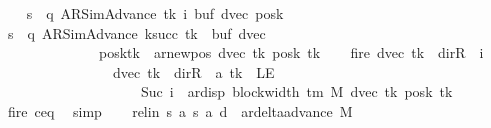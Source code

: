 \begin{isabellebody}
\ \ \isamarkupfalse%
\ {\isacharquery}{\kern0pt}s\ {\isacharequal}{\kern0pt}\ {\isachardoublequoteopen}{\isacharparenleft}{\kern0pt}q{\isacharcomma}{\kern0pt}\ AR{\isacharunderscore}{\kern0pt}SimAdvance{\isacharcomma}{\kern0pt}\ tk{\isacharcomma}{\kern0pt}\ i{\isacharcomma}{\kern0pt}\ buf{\isacharcomma}{\kern0pt}\ dvec{\isacharcomma}{\kern0pt}\ posk{\isacharparenright}{\kern0pt}{\isachardoublequoteclose}\isanewline
\ \ \isamarkupfalse%
\ {\isacharquery}{\kern0pt}s{\isacharprime}{\kern0pt}\ {\isacharequal}{\kern0pt}\ {\isachardoublequoteopen}{\isacharparenleft}{\kern0pt}q{\isacharcomma}{\kern0pt}\ AR{\isacharunderscore}{\kern0pt}SimAdvance{\isacharcomma}{\kern0pt}\ k{\isacharunderscore}{\kern0pt}succ\ tk{\isacharcomma}{\kern0pt}\ {}{\isacharcomma}{\kern0pt}\ buf{\isacharcomma}{\kern0pt}\ dvec{\isacharcomma}{\kern0pt}\isanewline
\ \ \ \ \ \ \ \ \ \ \ \ \ \ posk{\isacharparenleft}{\kern0pt}tk\ {\isacharcolon}{\kern0pt}{\isacharequal}{\kern0pt}\ ar{\isacharunderscore}{\kern0pt}newpos\ {\isacharparenleft}{\kern0pt}dvec\ tk{\isacharparenright}{\kern0pt}\ {\isacharparenleft}{\kern0pt}posk\ tk{\isacharparenright}{\kern0pt}{\isacharparenright}{\kern0pt}{\isacharparenright}{\kern0pt}{\isachardoublequoteclose}\isanewline
\ \ \isamarkupfalse%
\ fire{\isacharprime}{\kern0pt}{\isacharcolon}{\kern0pt}\ {\isachardoublequoteopen}{\isacharparenleft}{\kern0pt}dvec\ tk\ {\isacharequal}{\kern0pt}\ dir{\isachardot}{\kern0pt}R\ {\isasymand}\ i\ {\isacharequal}{\kern0pt}\ {}{\isacharparenright}{\kern0pt}\isanewline
\ \ \ \ \ \ \ \ \ \ \ \ \ \ \ {\isasymor}\ {\isacharparenleft}{\kern0pt}dvec\ tk\ {\isasymnoteq}\ dir{\isachardot}{\kern0pt}R\ {\isasymand}\ {\isacharquery}{\kern0pt}a\ tk\ {\isasymnoteq}\ LE{}\isanewline
\ \ \ \ \ \ \ \ \ \ \ \ \ \ \ \ \ \ \ {\isasymand}\ Suc\ i\ {\isacharequal}{\kern0pt}\ ar{\isacharunderscore}{\kern0pt}disp\ {\isacharparenleft}{\kern0pt}block{\isacharunderscore}{\kern0pt}width\ {\isacharparenleft}{\kern0pt}{\isasymGamma}{\isacharunderscore}{\kern0pt}tm\ M{\isacharparenright}{\kern0pt}{\isacharparenright}{\kern0pt}\ {\isacharparenleft}{\kern0pt}dvec\ tk{\isacharparenright}{\kern0pt}\ {\isacharparenleft}{\kern0pt}posk\ tk{\isacharparenright}{\kern0pt}{\isacharparenright}{\kern0pt}{\isachardoublequoteclose}\isanewline
\ \ \ \ \isamarkupfalse%
\ fire\ c{\isacharprime}{\kern0pt}{\isacharunderscore}{\kern0pt}eq\ \isamarkupfalse%
\ simp\isanewline
\ \ \isamarkupfalse%
\ rel{\isacharunderscore}{\kern0pt}in{\isacharcolon}{\kern0pt}\ {\isachardoublequoteopen}{\isacharparenleft}{\kern0pt}{\isacharquery}{\kern0pt}s{\isacharcomma}{\kern0pt}\ {\isacharquery}{\kern0pt}a{\isacharcomma}{\kern0pt}\ {\isacharquery}{\kern0pt}s{\isacharprime}{\kern0pt}{\isacharcomma}{\kern0pt}\ {\isacharquery}{\kern0pt}a{\isacharcomma}{\kern0pt}\ {\isacharquery}{\kern0pt}d{\isacharparenright}{\kern0pt}\ {\isasymin}\ ar{\isacharunderscore}{\kern0pt}delta{\isacharunderscore}{\kern0pt}advance\ M{\isachardoublequoteclose}\isanewline

\end{isabellebody}
